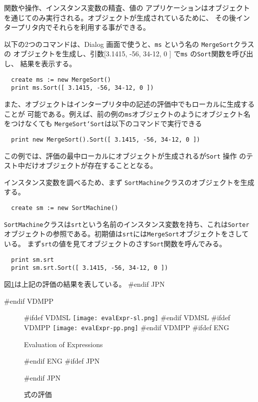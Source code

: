 \documentclass[\pformat,12pt]{article}
\newcommand{\aaa}{\tt }
\newcommand{\guicmd}[1]{{\sf #1}}
\newcommand{\guicmd}[1]{{\gt #1}}
\begin{document}
関数や操作、インスタンス変数の精査、値の
アプリケーションはオブジェクトを通じてのみ実行される。オブジェクトが生成されているために、
その後インタープリタ内でそれらを利用する事ができる。

以下の2つのコマンドは、\guicmd{Dialog} 画面で使うと、{\aaa ms} という名の {\aaa MergeSort}クラスの
オブジェクトを生成し、引数[3.1415, -56, 34-12, 0 ] で{\tt ms} の{\tt Sort}関数を呼び出し、
結果を表示する。

\begin{verbatim}
  create ms := new MergeSort()
  print ms.Sort([ 3.1415, -56, 34-12, 0 ])
\end{verbatim}

また、オブジェクトはインタープリタ中の記述の評価中でもローカルに生成することが
可能である。例えば、前の例の{\tt ms}オブジェクトのようにオブジェクト名をつけなくても
{\tt MergeSort`Sort}は以下のコマンドで実行できる 

\begin{verbatim}
  print new MergeSort().Sort([ 3.1415, -56, 34-12, 0 ])
\end{verbatim}

この例では、評価の最中ローカルにオブジェクトが生成されるが{\tt Sort} 操作
のテスト中だけオブジェクトが存在することとなる。

インスタンス変数を調べるため、まず {\tt SortMachine}クラスのオブジェクトを生成する。

\begin{verbatim}
  create sm := new SortMachine()
\end{verbatim}

{\tt SortMachine}クラスは{\tt srt}という名前のインスタンス変数を持ち、これは{\tt Sorter}
オブジェクトの参照である。初期値は{\tt srt}には{\tt MergeSort}オブジェクトをさしている。
まず{\tt srt}の値を見てオブジェクトのさす{\tt Sort}関数を呼んでみる。

\begin{verbatim}
  print sm.srt
  print sm.srt.Sort([ 3.1415, -56, 34-12, 0 ])
\end{verbatim}

図\ref{fig:evalgui}は上記の評価の結果を表している。
#endif JPN

#endif VDMPP

\begin{figure}[tbh]
\begin{center}
\mbox{}
#ifdef VDMSL
\texttt{[image: evalExpr-sl.png]}
#endif VDMSL
#ifdef VDMPP
\texttt{[image: evalExpr-pp.png]}
#endif VDMPP
#ifdef ENG
\caption{Evaluation of Expressions}
#endif ENG
#ifdef JPN
\caption{式の評価}
#endif JPN
\label{fig:evalgui}
\end{center}
\end{figure}
\end{document}
